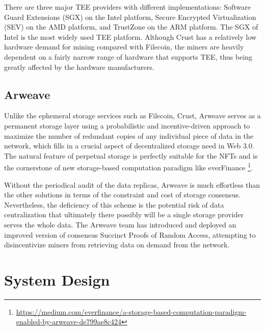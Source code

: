 \documentclass[]{article}
\begin{document}
There are three major TEE providers with different implementations: Software Guard Extensions (SGX) on the Intel platform, Secure Encrypted Virtualization (SEV) on the AMD platform, and TrustZone on the ARM platform. The SGX of Intel is the most widely used TEE platform. Although Crust has a relatively low hardware demand for mining compared with Filecoin, the miners are heavily dependent on a fairly narrow range of hardware that supports TEE, thus being greatly affected by the hardware manufacturers.

\subsection{Arweave}

Unlike the ephemeral storage services such as Filecoin, Crust, Arweave\cite{ref3} serves as a permanent storage layer using a probabilistic and incentive-driven approach to maximize the number of redundant copies of any individual piece of data in the network, which fills in a crucial aspect of decentralized storage need in Web 3.0. The natural feature of perpetual storage is perfectly suitable for the NFTs and is the cornerstone of new storage-based computation paradigm like everFinance \footnote{\url{https://medium.com/everfinance/a-storage-based-computation-paradigm-enabled-by-arweave-de799ae8c424}}.

Without the periodical audit of the data replicas, Arweave is much effortless than the other solutions in terms of the constraint and cost of storage consensus. Nevertheless, the deficiency of this scheme is the potential risk of data centralization that ultimately there possibly will be a single storage provider serves the whole data. The Arweave team has introduced and deployed an improved version of consensus Succinct Proofs of Random Access, attempting to disincentivize miners from retrieving data on demand from the network.



\section{System Design}
\end{document}
